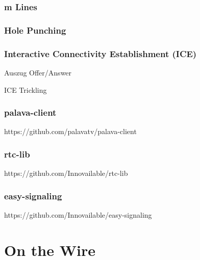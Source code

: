 \documentclass[12pt]{beamer}
\begin{document}
\begin{frame}
  \frametitle{m Lines}



\end{frame}

\begin{frame}
  \frametitle{Hole Punching}
  \centerline{}
\end{frame}

\begin{frame}
  \frametitle{Interactive Connectivity Establishment (ICE)}
  \pause
  
  \hfill \tiny Auszug Offer/Answer
  \vspace{15pt}
  \pause
  
  
  \hfill \tiny ICE Trickling
\end{frame}

\begin{frame}
  \frametitle{palava-client}
  \pause
  
  \hfill \tiny https://github.com/palavatv/palava-client
\end{frame}

\begin{frame}
  \frametitle{rtc-lib}
  \pause
  
  \hfill \tiny https://github.com/Innovailable/rtc-lib
\end{frame}

\begin{frame}
  \frametitle{easy-signaling}
  \pause
  
  \hfill \tiny https://github.com/Innovailable/easy-signaling
\end{frame}


\section{On the Wire}
\end{document}
